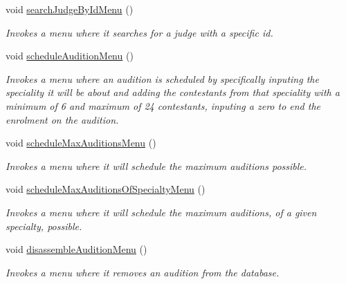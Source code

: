 \begin{DoxyCompactItemize}
\mbox{\label{class_company_m_s_aea5677ef70d7f4ac431389b34a26925e}} 
void \hyperlink{class_company_m_s_aea5677ef70d7f4ac431389b34a26925e}{search\+Judge\+By\+Id\+Menu} ()
\begin{DoxyCompactList}\small\item\em Invokes a menu where it searches for a judge with a specific id. \end{DoxyCompactList}\item 
\mbox{\label{class_company_m_s_a76272b167a7998779d794f6364812947}} 
void \hyperlink{class_company_m_s_a76272b167a7998779d794f6364812947}{schedule\+Audition\+Menu} ()
\begin{DoxyCompactList}\small\item\em Invokes a menu where an audition is scheduled by specifically inputing the speciality it will be about and adding the contestants from that speciality with a minimum of 6 and maximum of 24 contestants, inputing a zero to end the enrolment on the audition. \end{DoxyCompactList}\item 
\mbox{\label{class_company_m_s_a901868af75ab363760fdda9b2da76650}} 
void \hyperlink{class_company_m_s_a901868af75ab363760fdda9b2da76650}{schedule\+Max\+Auditions\+Menu} ()
\begin{DoxyCompactList}\small\item\em Invokes a menu where it will schedule the maximum auditions possible. \end{DoxyCompactList}\item 
\mbox{\label{class_company_m_s_ae4f6987bf9f61cfd9eba52a162f5efcc}} 
void \hyperlink{class_company_m_s_ae4f6987bf9f61cfd9eba52a162f5efcc}{schedule\+Max\+Auditions\+Of\+Specialty\+Menu} ()
\begin{DoxyCompactList}\small\item\em Invokes a menu where it will schedule the maximum auditions, of a given specialty, possible. \end{DoxyCompactList}\item 
\mbox{\label{class_company_m_s_aab9a0535cb3c6e0f909f892db15d3b92}} 
void \hyperlink{class_company_m_s_aab9a0535cb3c6e0f909f892db15d3b92}{disassemble\+Audition\+Menu} ()
\begin{DoxyCompactList}\small\item\em Invokes a menu where it removes an audition from the database. \end{DoxyCompactList}\item 

\end{DoxyCompactItemize}

